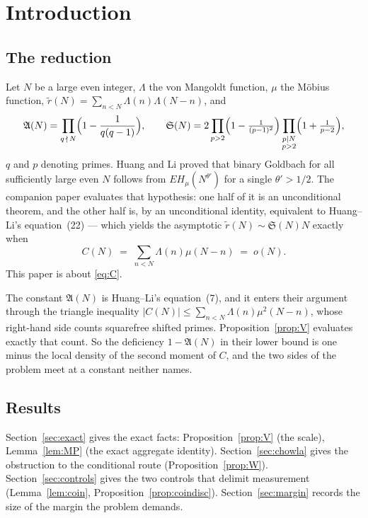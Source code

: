 \documentclass[11pt,a4paper]{article}
\theoremstyle{plain}
\theoremstyle{definition}
\theoremstyle{remark}
\renewcommand{\SS}{\mathfrak{S}}
\newcommand{\AAA}{\mathfrak{A}}
\begin{document}
\section{Introduction}

\subsection{The reduction}

Let $N$ be a large even integer, $\Lambda$ the von Mangoldt function,
$\mu$ the M\"obius function,
$\tilde r(N)=\sum_{n<N}\Lambda(n)\Lambda(N-n)$, and
\begin{equation}\label{eq:constants}
  \AAA(N)=\prod_{q\,\nmid\,N}\Bigl(1-\frac{1}{q(q-1)}\Bigr),
  \qquad
  \SS(N)=2\prod_{p>2}\Bigl(1-\tfrac{1}{(p-1)^2}\Bigr)
          \prod_{\substack{p\mid N\\ p>2}}\Bigl(1+\tfrac{1}{p-2}\Bigr),
\end{equation}
$q$ and $p$ denoting primes. Huang and Li \cite{HL} proved that binary
Goldbach for all sufficiently large even $N$ follows from
$EH_\mu(N^{\theta'})$ for a single $\theta'>1/2$. The companion paper
\cite{P1} evaluates that hypothesis: one half of it is an
unconditional theorem, and the other half is, by an unconditional
identity, equivalent to Huang--Li's equation~(22) --- which yields the
asymptotic $\tilde r(N)\sim\SS(N)N$ exactly when
\begin{equation}\label{eq:C}
  C(N)\;=\;\sum_{n<N}\Lambda(n)\mu(N-n)\;=\;o(N).
\end{equation}
This paper is about \eqref{eq:C}.

The constant $\AAA(N)$ is Huang--Li's equation~(7), and it enters
their argument through the triangle inequality
$|C(N)|\le\sum_{n<N}\Lambda(n)\mu^2(N-n)$, whose right-hand side
counts squarefree shifted primes. Proposition~\ref{prop:V} evaluates
exactly that count. So the deficiency $1-\AAA(N)$ in their lower bound
is one minus the local density of the second moment of $C$, and the
two sides of the problem meet at a constant neither names.

\subsection{Results}

Section~\ref{sec:exact} gives the exact facts:
Proposition~\ref{prop:V} (the scale), Lemma~\ref{lem:MP} (the exact
aggregate identity). Section~\ref{sec:chowla} gives the obstruction to
the conditional route (Proposition~\ref{prop:W}).
Section~\ref{sec:controls} gives the two controls that delimit
measurement (Lemma~\ref{lem:coin}, Proposition~\ref{prop:coindisc}).
Section~\ref{sec:margin} records the size of the margin the problem
demands.
\end{document}
